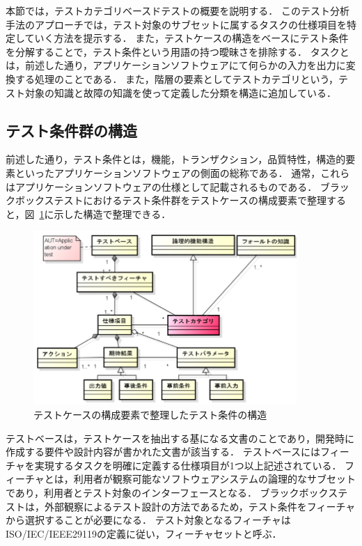本節では，テストカテゴリベースドテストの概要を説明する．
このテスト分析手法のアプローチでは，テスト対象のサブセットに属するタスクの仕様項目を特定していく方法を提示する．
また，テストケースの構造をベースにテスト条件を分解することで，テスト条件という用語の持つ曖昧さを排除する．
タスクとは，前述した通り，アプリケーションソフトウェアにて何らかの入力を出力に変換する処理のことである．
また，階層の要素としてテストカテゴリという，テスト対象の知識と故障の知識を使って定義した分類を構造に追加している．

\subsection{テスト条件群の構造}
前述した通り，テスト条件とは，機能，トランザクション，品質特性，構造的要素といったアプリケーションソフトウェアの側面の総称である．
通常，これらはアプリケーションソフトウェアの仕様として記載されるものである．
ブラックボックステストにおけるテスト条件群をテストケースの構成要素で整理すると，図~\ref{fig:D-2-FigTCStructure}に示した構造で整理できる．

\begin{figure}[htbp]
  \begin{center}
  \includegraphics[width=10cm]{./image/D-2-FigTCStructure.png}
  \caption{テストケースの構成要素で整理したテスト条件の構造}
  \label{fig:D-2-FigTCStructure}
  \end{center}
   \end{figure}

テストベースは，テストケースを抽出する基になる文書のことであり，開発時に作成する要件や設計内容が書かれた文書が該当する．
テストベースにはフィーチャを実現するタスクを明確に定義する仕様項目が1つ以上記述されている．
フィーチャとは，利用者が観察可能なソフトウェアシステムの論理的なサブセットであり，利用者とテスト対象のインターフェースとなる\cite{kang1990feature}．
ブラックボックステストは，外部観察によるテスト設計の方法であるため，テスト条件をフィーチャから選択することが必要になる．
テスト対象となるフィーチャはISO/IEC/IEEE29119の定義に従い，フィーチャセットと呼ぶ\cite{ISO29119}．

